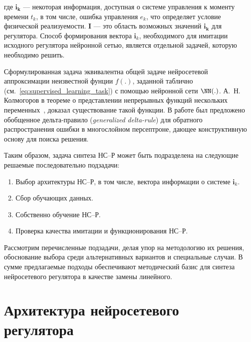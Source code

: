 \noindent где $\mathbf{i_k}$ --- некоторая информация, доступная о
системе управления к моменту времени $t_k$, в том числе, ошибка
управления $e_k$, что определяет условие физической реализуемости.
$\mathbf{I}$ --- это область возможных значений $\mathbf{i_k}$ для
регулятора.  Способ формирования вектора $\mathbf{i}_k$, необходимого
для имитации исходного регулятора нейронной сетью, является отдельной
задачей, которую необходимо решить.

Сформулированная задача эквивалентна общей задаче нейросетевой
аппроксимации неизвестной фунции $f(.)$, заданной таблично
(см.~\eqref{eq:supervised_learning_task}) с помощью нейронной сети
$\NN(.)$.  А.~Н. Колмогоров в теореме о представлении непрерывных
функций нескольких переменных~\cite{kolmog57}, доказал существование
такой функции.  В работе \cite{rumelhart86} был предложено обобщенное
дельта-правило ({\em generalized delta-rule}) для обратного
распространения ошибки в многослойном персептроне, дающее
конструктивную основу для поиска решения.

Таким образом, задача синтеза НС--Р может быть подразделена на
следующие решаемые последовательно подзадачи:
\begin{enumerate}
\item Выбор архитектуры НС--Р, в том числе, вектора информации о
  системе $\mathbf{i}_k$.
\item Сбор обучающих данных.
\item Собственно обучение НС--Р.
\item Проверка качества имитации и функционирования НС--Р.
\end{enumerate}

Рассмотрим перечисленные подзадачи, делая упор на методологию их
решения, обоснование выбора среди альтернативных вариантов и
специальные случаи.  В сумме предлагаемые подходы обеспечивают
методический базис для синтеза нейросетевого регулятора в качестве
замены линейного.



\section{Архитектура нейросетевого регулятора}\label{nnc_arch}


